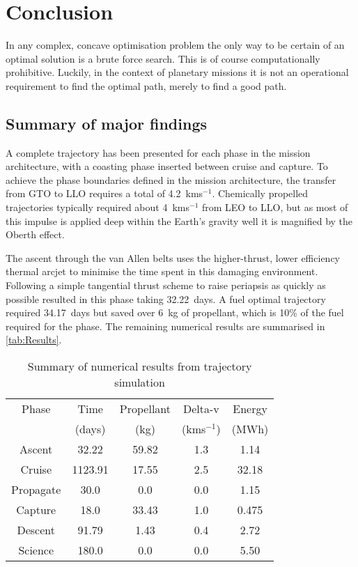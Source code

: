 \chapter{Conclusion} \label{cha:Conclusion}

In any complex, concave optimisation problem the only way to be certain of an optimal solution is a brute force search. This is of course computationally prohibitive. Luckily, in the context of planetary missions it is not an operational requirement to find the optimal path, merely to find a good path. 

\section{Summary of major findings}

A complete trajectory has been presented for each phase in the mission architecture, with a coasting phase inserted between cruise and capture. To achieve the phase boundaries defined in the mission architecture, the transfer from GTO to LLO requires a total of 4.2~kms$^{-1}$. Chemically propelled trajectories typically required about 4~kms$^{-1}$ from LEO to LLO, but as most of this impulse is applied deep within the Earth's gravity well it is magnified by the Oberth effect.

The ascent through the van Allen belts uses the higher-thrust, lower efficiency thermal arcjet to minimise the time spent in this damaging environment. Following a simple tangential thrust scheme to raise periapsis as quickly as possible resulted in this phase taking 32.22~days. A fuel optimal trajectory required 34.17~days but saved over 6~kg of propellant, which is 10\% of the fuel required for the phase. The remaining numerical results are summarised in \autoref{tab:Results}.

\begin{table}
\caption{Summary of numerical results from trajectory simulation}
\label{tab:Results}
\centering
\begin{tabular}{ccccc} \toprule
Phase & Time & Propellant & Delta-v & Energy \tabularnewline
& (days) & (kg) & (kms$^{-1}$) & (MWh) \tabularnewline\midrule
Ascent & 32.22 & 59.82 & 1.3 & 1.14 \tabularnewline
Cruise & 1123.91 & 17.55 & 2.5 & 32.18 \tabularnewline
Propagate & 30.0 & 0.0 & 0.0 & 1.15 \tabularnewline
Capture &18.0 & 33.43 & 1.0 & 0.475 \tabularnewline
Descent & 91.79 & 1.43 & 0.4 & 2.72 \tabularnewline
Science &180.0 & 0.0 & 0.0 & 5.50 \tabularnewline\bottomrule
\end{tabular}
\end{table}


